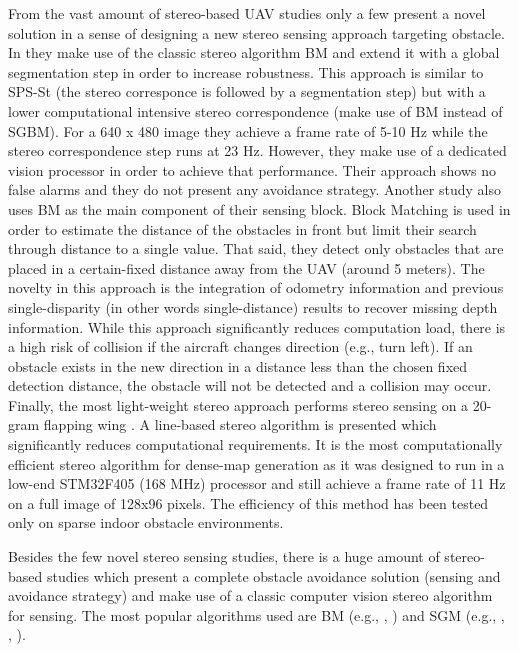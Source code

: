 From the vast amount of stereo-based UAV studies only a few present a novel solution in a sense of designing a new stereo sensing approach targeting obstacle. In \cite{Byrne2006} they make use of the classic stereo algorithm \ac{BM} and extend it with a global segmentation step in order to increase robustness. This approach is similar to \ac{SPS-St} (the stereo corresponce is followed by a segmentation step) but with a lower computational intensive stereo correspondence (make use of \ac{BM} instead of \ac{SGBM}). For a 640 x 480 image they achieve a frame rate of 5-10 Hz while the stereo correspondence step runs at 23 Hz. However, they make use of a dedicated vision processor in order to achieve that performance. Their approach shows no false alarms and they do not present any avoidance strategy. Another study also uses \acs{BM} as the main component of their sensing block\cite{Barry2018}. Block Matching is used in order to estimate the distance of the obstacles in front but limit their search through distance to a single value. That said, they detect only obstacles that are placed in a certain-fixed distance away from the UAV (around 5 meters). The novelty in this approach is the integration of odometry information and previous single-disparity (in other words single-distance) results to recover missing depth information. While this approach significantly reduces computation load, there is a high risk of collision if the aircraft changes direction (e.g., turn left). If an obstacle exists in the new direction in a distance less than the chosen fixed detection distance, the obstacle will not be detected and a collision may occur. Finally, the most light-weight stereo approach performs stereo sensing on a 20-gram flapping wing \cite{DeWagter2014}. A line-based stereo algorithm is presented which significantly reduces computational requirements. It is the most computationally efficient stereo algorithm for dense-map generation as it was designed to run in a low-end STM32F405 (168 MHz) processor and still achieve a frame rate of 11 Hz on a full image of 128x96 pixels. The efficiency of this method has been tested only on sparse indoor obstacle environments.

Besides the few novel stereo sensing studies, there is a huge amount of stereo-based studies which present a complete obstacle avoidance solution (sensing and avoidance strategy) and make use of a classic computer vision stereo algorithm for sensing. The most popular algorithms used are \ac{BM} (e.g., \cite{Heng2011}, \cite{Meier2012}) and \ac{SGM} (e.g., \cite{Barrientos2011a}, \cite{Oleynikova2015a}, \cite{Ruf2018a}). 


